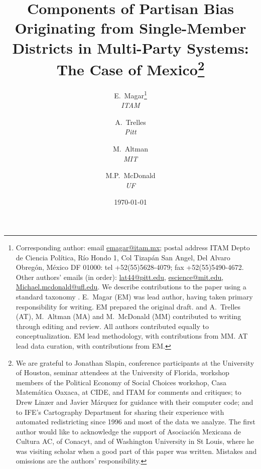 \documentclass[letter,12pt]{article}
\begin{document}
\title{Components of Partisan Bias Originating from Single-Member Districts in Multi-Party Systems: The Case of Mexico\thanks{We are grateful to Jonathan Slapin, conference participants at the University of Houston, seminar attendees at the University of Florida, workshop members of the Political Economy of Social Choices workshop, Casa Matem\'atica Oaxaca, at CIDE, and ITAM for comments and critiques; to Drew Linzer and Javier M\'arquez for guidance with their computer code; and to IFE's Cartography Department for sharing their experience with automated redistricting since 1996 and most of the data we analyze. The first author would like to acknowledge the support of Asociaci\'on Mexicana de Cultura AC, of Conacyt, and of Washington University in St Louis, where he was visiting scholar when a good part of this paper was written. Mistakes and omissions are the authors' responsibility.}}
\author{E.~Magar\footnote{Corresponding author: email \url{emagar@itam.mx}; postal address ITAM Depto de Ciencia Pol\'itica, R\'io Hondo 1, Col Tizap\'an San Angel, Del Alvaro Obreg\'on, M\'exico DF 01000: tel +52(55)5628-4079; fax +52(55)5490-4672.  Other authors' emails (in order): \url{lat44@pitt.edu}, \url{escience@mit.edu}, \url{Michael.mcdonald@ufl.edu}.  We describe contributions to the paper using a standard taxonomy \citep{allen2014credit}. E.~Magar (EM) was lead author, having taken primary responsibility for writing. EM prepared the original draft. and A.~Trelles (AT), M.~Altman (MA) and M.~McDonald (MM) contributed to writing through editing and review. All authors contributed equally to conceptualization. EM lead methodology, with contributions from MM. AT lead data curation, with contributions from EM.} \\ \emph{ITAM} \and
        A.~Trelles \\ \emph{Pitt} \and  
        M.~Altman \\ \emph{MIT}  \and
        M.P.~McDonald \\ \emph{UF} 
      }
\date{\today}
\maketitle




\end{document}
